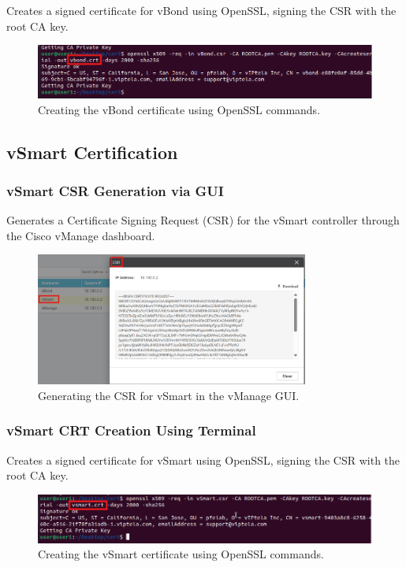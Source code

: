 \documentclass[12pt,english]{report}
\begin{document}
Creates a signed certificate for vBond using OpenSSL, signing the CSR with the root CA key.

\begin{figure}[H]
    \centering
    \includegraphics[width=1\textwidth]{appendix/vbond-crt.png}
    \caption{Creating the vBond certificate using OpenSSL commands.}
    \label{fig:vbond-crt}
\end{figure}

\subsection{vSmart Certification}

\subsubsection{vSmart CSR Generation via GUI}

Generates a Certificate Signing Request (CSR) for the vSmart controller through the Cisco vManage dashboard.

\begin{figure}[H]
    \centering
    \includegraphics[width=0.8\textwidth]{appendix/vsmart-csr.png}
    \caption{Generating the CSR for vSmart in the vManage GUI.}
    \label{fig:vsmart-csr}
\end{figure}

\subsubsection{vSmart CRT Creation Using Terminal}

Creates a signed certificate for vSmart using OpenSSL, signing the CSR with the root CA key.

\begin{figure}[H]
    \centering
    \includegraphics[width=1\textwidth]{appendix/vsmart-crt.png}
    \caption{Creating the vSmart certificate using OpenSSL commands.}
    \label{fig:vsmart-crt}
\end{figure}
\end{document}

